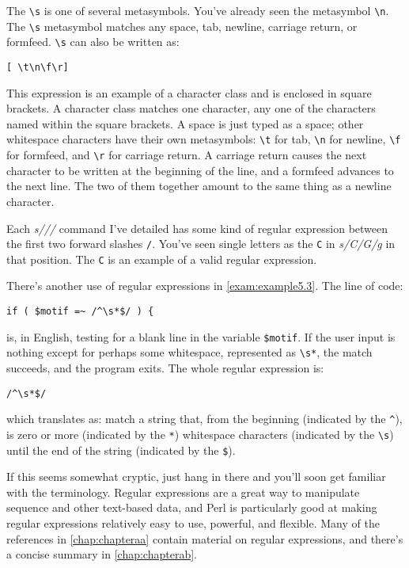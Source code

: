 The \verb|\s| is one of several metasymbols. You've already seen the metasymbol \verb|\n|. The \verb|\s| metasymbol matches any space, tab, newline, carriage return, or formfeed. \verb|\s| can also be written as: 

\begin{lstlisting}
[ \t\n\f\r]
\end{lstlisting}

This expression is an example of a character class and is enclosed in square brackets. A character class matches one character, any one of the characters named within the square brackets. A space is just typed as a space; other whitespace characters have their own metasymbols: \verb|\t| for tab, \verb|\n| for newline, \verb|\f| for formfeed, and \verb|\r| for carriage return. A carriage return causes the next character to be written at the beginning of the line, and a formfeed advances to the next line. The two of them together amount to the same thing as a newline character.

Each \textit{s///} command I've detailed has some kind of regular expression between the first two forward slashes \verb|/|. You've seen single letters as the \verb|C| in \textit{s/C/G/g} in that position. The \verb|C| is an example of a valid regular expression.

There's another use of regular expressions in \autoref{exam:example5.3}. The line of code: 

\begin{lstlisting}
if ( $motif =~ /^\s*$/ ) {
\end{lstlisting}

is, in English, testing for a blank line in the variable \verb|$motif|. If the user input is nothing except for perhaps some whitespace, represented as \verb|\s*|, the match succeeds, and the program exits. The whole regular expression is: 

\begin{lstlisting}
/^\s*$/
\end{lstlisting}

which translates as: match a string that, from the beginning (indicated by the \verb|^|), is zero or more (indicated by the \verb|*|) whitespace characters (indicated by the \verb|\s|) until the end of the string (indicated by the \verb|$|).

If this seems somewhat cryptic, just hang in there and you'll soon get familiar with the terminology. Regular expressions are a great way to manipulate sequence and other text-based data, and Perl is particularly good at making regular expressions relatively easy to use, powerful, and flexible. Many of the references in \autoref{chap:chapteraa} contain material on regular expressions, and there's a concise summary in \autoref{chap:chapterab}.

